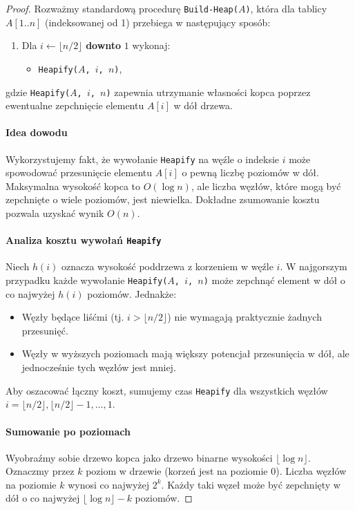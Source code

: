 \documentclass[12pt]{article}
\begin{document}
\begin{proof}
Rozważmy standardową procedurę \texttt{Build-Heap($A$)}, która dla tablicy
$A[1..n]$ (indeksowanej od 1) przebiega w następujący sposób:
\begin{enumerate}
  \item Dla $i \leftarrow \lfloor n/2 \rfloor$ \textbf{downto} $1$ wykonaj:
    \begin{itemize}
      \item \texttt{Heapify($A$, $i$, $n$)},
    \end{itemize}
\end{enumerate}
gdzie \texttt{Heapify($A$, $i$, $n$)} zapewnia utrzymanie własności kopca
poprzez ewentualne zepchnięcie elementu $A[i]$ w dół drzewa.

\paragraph{Idea dowodu}
Wykorzystujemy fakt, że wywołanie \texttt{Heapify} na węźle o indeksie $i$
może spowodować przesunięcie elementu $A[i]$ o pewną liczbę poziomów w dół.
Maksymalna wysokość kopca to $O(\log n)$, ale liczba węzłów, które mogą być
zepchnięte o wiele poziomów, jest niewielka. Dokładne zsumowanie kosztu
pozwala uzyskać wynik $O(n)$.

\paragraph{Analiza kosztu wywołań \texttt{Heapify}}
Niech $h(i)$ oznacza wysokość poddrzewa z korzeniem w węźle $i$. W najgorszym
przypadku każde wywołanie \texttt{Heapify($A$, $i$, $n$)} może zepchnąć
element w dół o co najwyżej $h(i)$ poziomów. Jednakże:
\begin{itemize}
  \item Węzły będące liśćmi (tj. $i > \lfloor n/2 \rfloor$) nie wymagają
        praktycznie żadnych przesunięć.
  \item Węzły w wyższych poziomach mają większy potencjał przesunięcia w dół,
        ale jednocześnie tych węzłów jest mniej.
\end{itemize}

Aby oszacować łączny koszt, sumujemy czas \texttt{Heapify} dla wszystkich
węzłów $i = \lfloor n/2 \rfloor, \lfloor n/2 \rfloor - 1, \dots, 1$. 

\paragraph{Sumowanie po poziomach}
Wyobraźmy sobie drzewo kopca jako drzewo binarne wysokości $\lfloor \log n \rfloor$.
Oznaczmy przez $k$ poziom w drzewie (korzeń jest na poziomie 0). Liczba
węzłów na poziomie $k$ wynosi co najwyżej $2^k$. Każdy taki węzeł może być
zepchnięty w dół o co najwyżej $\lfloor \log n \rfloor - k$ poziomów.


\end{proof}
\end{document}
